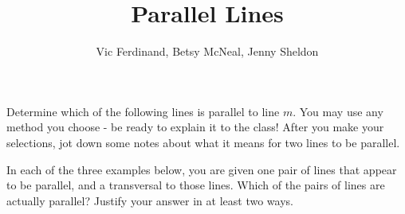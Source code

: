 \documentclass[nooutcomes]{ximera}
\title{Parallel Lines}
\author{Vic Ferdinand, Betsy McNeal, Jenny Sheldon}
\begin{document}
\begin{abstract}\end{abstract}
\maketitle


\begin{problem} \label{ParallelLines1}
Determine which of the following lines is parallel to line $m$.  You may use any method you choose - be ready to explain it to the class!  After you make your selections, jot down some notes about what it means for two lines to be parallel.

\begin{center}
\end{center}


\end{problem}


\newpage
\begin{problem} \label{ParallelLines2}

In each of the three examples below, you are given one pair of lines that appear to be parallel, and a transversal to those lines.  Which of the pairs of lines are actually parallel?  Justify your answer in at least two ways.


\begin{center}
\end{center}

\begin{center}
\end{center}

\begin{center}
\end{center}





\end{problem}
\end{document}
